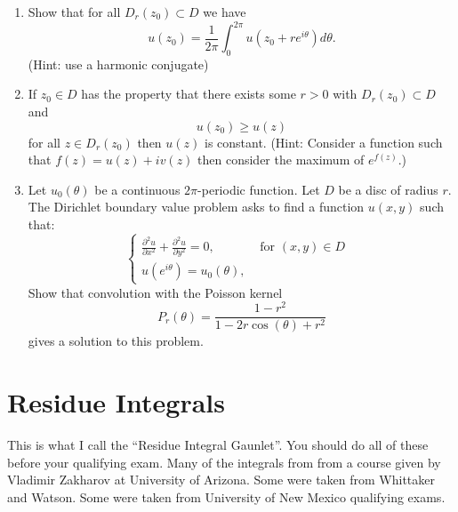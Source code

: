 \documentclass[a4paper,10pt]{article}
\begin{document}
\begin{enumerate}
		\item Show that for all $D_r(z_0) \subset D$ we have 
		$$ u(z_0) = \frac{1}{2\pi} \int_0^{2\pi} u(z_0+ r e^{i\theta}) d\theta. $$ (Hint: use a harmonic conjugate)
		\item If $z_0 \in D$ has the property that there exists some $r>0$ with $D_r(z_0) \subset D$ and 
		$$ u(z_0) \geq u(z) $$
		for all $z \in D_r(z_0)$ then $u(z)$ is constant. 
		(Hint: Consider a function such that $f(z) = u(z)+iv(z)$ then consider the maximum of $e^{f(z)}$.)
		
		
			
		\item Let $u_0(\theta)$ be a continuous $2\pi$-periodic function. 
			Let $D$ be a disc of radius $r$. 
			The Dirichlet boundary value problem asks to find a function $u(x,y)$ such that:
			$$ \begin{cases}
			\frac{\partial^2 u}{\partial x^2} + \frac{\partial^2 u}{\partial y^2} =0, & \mbox{ for $(x,y)\in D$ } \\
			u(e^{i\theta})= u_0(\theta), & 
			\end{cases}
			$$
			Show that convolution with the Poisson kernel 
			$$P_r(\theta) = \frac{1-r^2}{1-2r\cos(\theta) + r^2}$$
			gives a solution to this problem. 
			
	
	

	
\end{enumerate}

\section{Residue Integrals}
This is what I call the ``Residue Integral Gaunlet''. You should do all of these before your qualifying exam. 
Many of the integrals from from a course given by Vladimir Zakharov at University of Arizona. 
Some were taken from Whittaker and Watson. Some were taken from University of New Mexico qualifying exams.
\end{document}
